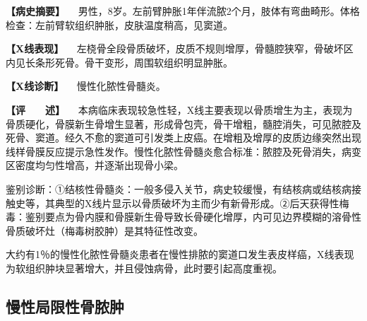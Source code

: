 \textbf{【病史摘要】}
　男性，8岁。左前臂肿胀1年伴流脓2个月，肢体有弯曲畸形。体格检查：左前臂软组织肿胀，皮肤温度稍高，见窦道。

\textbf{【X线表现】}
　左桡骨全段骨质破坏，皮质不规则增厚，骨髓腔狭窄，骨破坏区内见长条形死骨。骨干变形，周围软组织明显肿胀。

\textbf{【X线诊断】} 　慢性化脓性骨髓炎。

\textbf{【评　　述】}
　本病临床表现较急性轻，X线主要表现以骨质增生为主，表现为骨质硬化，骨膜新生骨增生显著，形成骨包壳，骨干增粗，髓腔消失，可见脓腔及死骨、窦道。经久不愈的窦道可引发类上皮癌。在增粗及增厚的皮质边缘突然出现线样骨膜反应提示急性发作。慢性化脓性骨髓炎愈合标准：脓腔及死骨消失，病变区密度均匀性增高，并逐渐出现骨小梁。

鉴别诊断：①结核性骨髓炎：一般多侵入关节，病史较缓慢，有结核病或结核病接触史等，其典型的X线片显示以骨质破坏为主而少有新骨形成。②后天获得性梅毒：鉴别要点为骨内膜和骨膜新生骨导致长骨硬化增厚，内可见边界模糊的溶骨性骨质破坏灶（梅毒树胶肿）是其特征性改变。

大约有1％的慢性化脓性骨髓炎患者在慢性排脓的窦道口发生表皮样癌，X线表现为软组织肿块显著增大，并且侵蚀病骨，此时要引起高度重视。

\subsection{慢性局限性骨脓肿}

